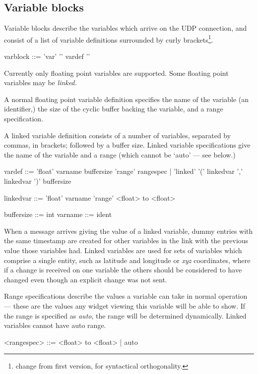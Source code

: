 \subsection{Variable blocks}
Variable blocks describe the variables which arrive on the UDP
connection, and consist of a list of variable definitions surrounded
by curly brackets\footnote{change from first version, for syntactical orthogonality.}.
\begin{v}
varblock    ::= 'var' '{' {vardef} '}'
\end{v}
Currently only floating point variables are supported.
Some floating point variables may be \emph{linked.}

A normal floating point variable definition specifies the name of the variable
(an identifier,) the size of the cyclic buffer backing the variable,
and a range specification.

A linked variable definition consists of a number of variables,
separated by commas, in brackets; followed by a buffer size.
Linked variable specifications give the name of the variable and
a range (which cannot be `auto' --- see below.)
\begin{v}
vardef      ::= 'float' varname buffersize 'range' rangespec
            |   'linked' '(' { linkedvar ',' } linkedvar ')' buffersize

linkedvar   ::= 'float' varname 'range' <float> to <float>

buffersize  ::= int
varname     ::= ident
            
\end{v}
When a message arrives giving the value of a linked variable, dummy
entries with the same timestamp are created for other variables
in the link with the previous value those variables had. Linked
variables are used for sets of variables which comprise a single
entity, such as latitude and longitude or \emph{xyz} coordinates,
where if a change is received on one variable the others should be
considered to have changed even though an explicit change was not
sent.

Range specifications describe the values a variable can take in
normal operation --- these are the values any widget viewing this
variable will be able to show. If the range is specified as \emph{auto},
the range will be determined dynamically. Linked variables cannot
have auto range.
\begin{v}
<rangespec> ::= <float> to <float>
                | auto
\end{v}

